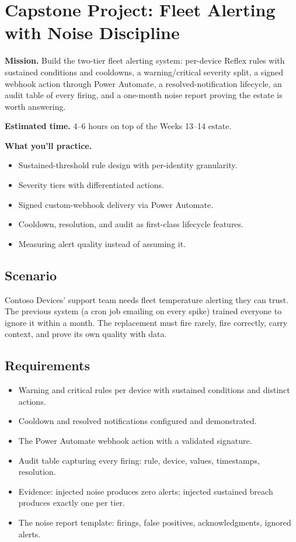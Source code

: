 \section{Capstone Project: Fleet Alerting with Noise Discipline}\label{sec:ch15-capstone}

\begin{capstonebox}
\textbf{Mission.} Build the two-tier fleet alerting system: per-device Reflex rules with sustained conditions and cooldowns, a warning/critical severity split, a signed webhook action through Power Automate, a resolved-notification lifecycle, an audit table of every firing, and a one-month noise report proving the estate is worth answering.

\textbf{Estimated time.} 4--6 hours on top of the Weeks 13--14 estate.

\textbf{What you'll practice.}
\begin{itemize}
    \item Sustained-threshold rule design with per-identity granularity.
    \item Severity tiers with differentiated actions.
    \item Signed custom-webhook delivery via Power Automate.
    \item Cooldown, resolution, and audit as first-class lifecycle features.
    \item Measuring alert quality instead of assuming it.
\end{itemize}
\end{capstonebox}

\subsection*{Scenario}
Contoso Devices' support team needs fleet temperature alerting they can trust. The previous system (a cron job emailing on every spike) trained everyone to ignore it within a month. The replacement must fire rarely, fire correctly, carry context, and prove its own quality with data.

\subsection*{Requirements}
\begin{itemize}
    \item Warning and critical rules per device with sustained conditions and distinct actions.
    \item Cooldown and resolved notifications configured and demonstrated.
    \item The Power Automate webhook action with a validated signature.
    \item Audit table capturing every firing: rule, device, values, timestamps, resolution.
    \item Evidence: injected noise produces zero alerts; injected sustained breach produces exactly one per tier.
    \item The noise report template: firings, false positives, acknowledgments, ignored alerts.
\end{itemize}

